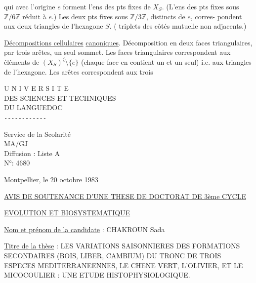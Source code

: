 

qui avec l'origine $e$ forment l'ens des pts fixes de $X_S$.
(L'ens des pts fixes sous $\mathbb Z/6\mathbb Z$  réduit
à $e$.) Les deux pts fixes sous $\mathbb Z/3\mathbb Z$, distincts de $e$, corres-\newline
pondent aux deux triangles  de l'hexagone $S$.
( triplets des côtés mutuelle non adjacents.)

\uline{Décompositions cellulaires}\newline
\uline{canoniques}. Décomposition en deux faces triangulaires, par trois arêtes,
un seul sommet. Les faces triangulaires correspondent aux éléments de
$(X_S)^\zeta\setminus\{e\}$ (chaque face en contient un et un seul) i.e.
aux triangles  de l'hexagone. Les arêtes correspondent aux trois



\noindent
\begin{minipage}[t]{.43\linewidth}
\centering\small
U N I V E R S I T E\\
DES SCIENCES ET TECHNIQUES\\
DU LANGUEDOC\\
\texttt{-{}-{}-{}-{}-{}-{}-{}-{}-{}-{}-{}-}

Service de la Scolarité\\
MA/GJ\\
Diffusion : Liste A\\
N°: 4680
\end{minipage}\hfill
\begin{minipage}[t]{.53\linewidth}
\small\vspace{2\baselineskip}
Montpellier, le 20 octobre 1983
\end{minipage}

\begin{center}
\uline{AVIS DE SOUTENANCE D'UNE THESE DE DOCTORAT DE 3ème CYCLE}

\uline{EVOLUTION ET BIOSYSTEMATIQUE}
\end{center}

\uline{Nom et prénom de la candidate} : CHAKROUN Sada

\uline{Titre de la thèse} : LES VARIATIONS SAISONNIERES DES FORMATIONS SECONDAIRES (BOIS, LIBER, CAMBIUM) DU TRONC DE TROIS ESPECES MEDITERRANEENNES, LE CHENE VERT, L'OLIVIER, ET LE MICOCOULIER : UNE ETUDE HISTOPHYSIOLOGIQUE.

